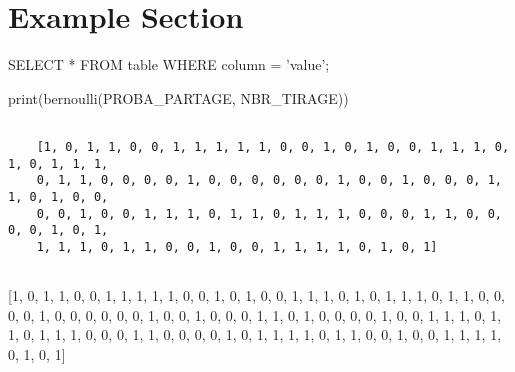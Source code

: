 \section{Example Section} \label{sec:-example-section}

\begin{sqlcode}

    SELECT * FROM table WHERE column = 'value';

\end{sqlcode}

\begin{pythoncode}

    print(bernoulli(PROBA_PARTAGE, NBR_TIRAGE))

\end{pythoncode}

\begin{verbatim}

    [1, 0, 1, 1, 0, 0, 1, 1, 1, 1, 1, 0, 0, 1, 0, 1, 0, 0, 1, 1, 1, 0, 1, 0, 1, 1, 1,
    0, 1, 1, 0, 0, 0, 0, 1, 0, 0, 0, 0, 0, 0, 1, 0, 0, 1, 0, 0, 0, 1, 1, 0, 1, 0, 0,
    0, 0, 1, 0, 0, 1, 1, 1, 0, 1, 1, 0, 1, 1, 1, 0, 0, 0, 1, 1, 0, 0, 0, 0, 1, 0, 1,
    1, 1, 1, 0, 1, 1, 0, 0, 1, 0, 0, 1, 1, 1, 1, 0, 1, 0, 1]


\end{verbatim}

\begin{consolecode}

    [1, 0, 1, 1, 0, 0, 1, 1, 1, 1, 1, 0, 0, 1, 0, 1, 0, 0, 1, 1, 1, 0, 1, 0, 1, 1, 1,
    0, 1, 1, 0, 0, 0, 0, 1, 0, 0, 0, 0, 0, 0, 1, 0, 0, 1, 0, 0, 0, 1, 1, 0, 1, 0, 0,
    0, 0, 1, 0, 0, 1, 1, 1, 0, 1, 1, 0, 1, 1, 1, 0, 0, 0, 1, 1, 0, 0, 0, 0, 1, 0, 1,
    1, 1, 1, 0, 1, 1, 0, 0, 1, 0, 0, 1, 1, 1, 1, 0, 1, 0, 1]

\end{consolecode}